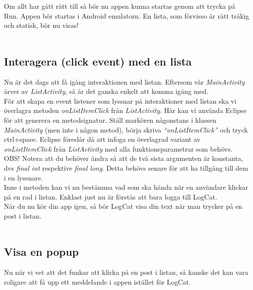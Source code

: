\documentclass[11 pt, titlepage]{article} %
\begin{document}
Om allt har gått rätt till så bör nu appen kunna startas genom att trycka på Run. Appen bör startas i Android emulatorn. En lista, som förvisso är rätt tråkig och statisk, bör nu visas!\\ \\


\subsection{Interagera (click event) med en lista}
Nu är det dags att få igång interaktionen med listan. Eftersom vår \textit{MainActivity} ärver av \textit{ListActivity}, så är det ganska enkelt att komma igång med.\\

För att skapa en event listener som lyssnar på interaktioner med listan ska vi överlagra metoden \textit{onListItemClick} från \textit{ListActivity}. Här kan vi använda Eclipse för att generera en metodsignatur. Ställ markören någonstans i klassen \textit{MainActivity} (men inte i någon metod), börja skriva \textit{“onListItemClick”} och tryck ctrl+space. Eclipse föreslår då att infoga en överlagrad variant av \textit{onListItemClick} från \textit{ListActivity} med alla funktionsparametrar som behövs.\\

OBS! Notera att du behöver ändra så att de två sista argumenten är konstanta, dvs \textit{final int} respektive \textit{final long}. Detta behövs senare för att ha tillgång till dem i en lyssnare.\\

Inne i metoden kan vi nu bestämma vad som ska hända när en användare klickar på en rad i listan. Enklast just nu är förstås att bara logga till LogCat.\\

När du nu kör din app igen, så bör LogCat visa din text när man trycker på en post i listan.\\ \\
\subsection{Visa en popup}
Nu när vi vet att det funkar att klicka på en post i listan, så kanske det kan vara roligare att få upp ett meddelande i appen istället för LogCat.
\end{document}
